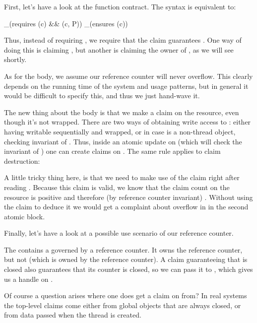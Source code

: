 \noindent
First, let's have a look at the function contract.
The syntax  is equivalent to:
\begin{VCC}
  _(requires \wrapped(c) && \claims(c, P))
  _(ensures \wrapped(c))
\end{VCC}
Thus, instead of requiring , we require that the claim
guarantees .
One way of doing this is claiming , but another is claiming the owner
of , as we will see shortly.

As for the body, we assume our reference counter will never overflow.
This clearly depends on the running time of the system and usage patterns,
but in general it would be difficult to specify this, and thus we just
hand-wave it.

The new thing about the body is that we make a claim on the resource,
even though it's not wrapped.
There are two ways of obtaining write access to :
either having  writable sequentially and wrapped,
or in case  is a non-thread object, checking
invariant of .
Thus, inside an atomic update on  (which will check the invariant of ) one can create
claims on .
The same rule applies to claim destruction:


\noindent
A little tricky thing here, is that we need to make use of the  claim
right after reading . 
Because this claim is valid, we know that the claim count on the resource
is positive and therefore (by reference counter invariant) .
Without using the  claim to deduce it we would get a complaint
about overflow in  in the second atomic block.

Finally, let's have a look at a possible use scenario of our reference counter.


\noindent
The  contains a  governed by a reference counter.
It owns the reference counter, but not  (which is owned by the reference
counter).
A claim guaranteeing that  is closed also guarantees
that its counter is closed, so we can pass it to ,
which gives us a handle on .

Of course a question arises where one does get a claim on  from?
In real systems the top-level claims come either from global objects that are
always closed, or from data passed when the thread is created.

